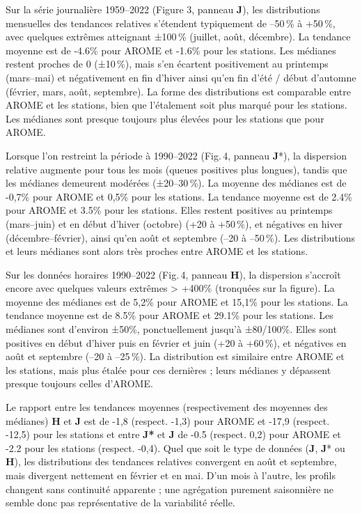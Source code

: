 \documentclass[
  article,
  nofooter,
  noheadings]{jss}
\begin{document}
Sur la série journalière 1959--2022 (Figure 3, panneau \textbf{J}), les
distributions mensuelles des tendances relatives s'étendent typiquement
de --50\,\% à +50\,\%, avec quelques extrêmes atteignant ±100\,\%
(juillet, août, décembre). La tendance moyenne est de -4.6\% pour AROME
et -1.6\% pour les stations. Les médianes restent proches de 0
(±10\,\%), mais s'en écartent positivement au printemps (mars--mai) et
négativement en fin d'hiver ainsi qu'en fin d'été / début d'automne
(février, mars, août, septembre). La forme des distributions est
comparable entre AROME et les stations, bien que l'étalement soit plus
marqué pour les stations. Les médianes sont presque toujours plus
élevées pour les stations que pour AROME.

Lorsque l'on restreint la période à 1990--2022 (Fig.\,4, panneau
\textbf{J}*), la dispersion relative augmente pour tous les mois (queues
positives plus longues), tandis que les médianes demeurent modérées
(±20--30\,\%). La moyenne des médianes est de -0,7\% pour AROME et 0,5\%
pour les stations. La tendance moyenne est de 2.4\% pour AROME et 3.5\%
pour les stations. Elles restent positives au printemps (mars--juin) et
en début d'hiver (octobre) (+20 à +50\,\%), et négatives en hiver
(décembre--février), ainsi qu'en août et septembre (--20 à --50\,\%).
Les distributions et leurs médianes sont alors très proches entre AROME
et les stations.

Sur les données horaires 1990--2022 (Fig.\,4, panneau \textbf{H}), la
dispersion s'accroît encore avec quelques valeurs extrêmes
\textgreater{} +400\% (tronquées sur la figure). La moyenne des médianes
est de 5,2\% pour AROME et 15,1\% pour les stations. La tendance moyenne
est de 8.5\% pour AROME et 29.1\% pour les stations. Les médianes sont
d'environ ±50\%, ponctuellement jusqu'à ±80/100\%. Elles sont positives
en début d'hiver puis en février et juin (+20 à +60\,\%), et négatives
en août et septembre (--20 à --25\,\%). La distribution est similaire
entre AROME et les stations, mais plus étalée pour ces dernières ; leurs
médianes y dépassent presque toujours celles d'AROME.

Le rapport entre les tendances moyennes (respectivement des moyennes des
médianes) \textbf{H} et \textbf{J} est de -1,8 (respect. -1,3) pour
AROME et -17,9 (respect. -12,5) pour les stations et entre \textbf{J*}
et \textbf{J} de -0.5 (respect. 0,2) pour AROME et -2.2 pour les
stations (respect. -0,4). Quel que soit le type de données (\textbf{J},
\textbf{J}* ou \textbf{H}), les distributions des tendances relatives
convergent en août et septembre, mais divergent nettement en février et
en mai. D'un mois à l'autre, les profils changent sans continuité
apparente ; une agrégation purement saisonnière ne semble donc pas
représentative de la variabilité réelle.
\end{document}
